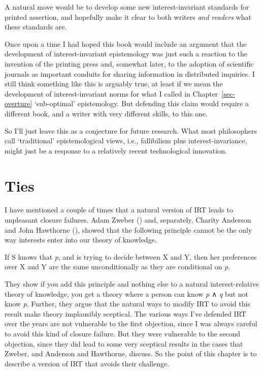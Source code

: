 \documentclass[
  10pt,
  letterpaper,
  twoside]{scrbook}
\providecommand{\tightlist}{%
  \setlength{\itemsep}{0pt}\setlength{\parskip}{0pt}}\usepackage{longtable,booktabs,array}
\begin{document}
A natural move would be to develop some new interest-invariant standards
for printed assertion, and hopefully make it clear to both writers
\emph{and readers} what these standards are.

Once upon a time I had hoped this book would include an argument that
the development of interest-invariant epistemology was just such a
reaction to the invention of the printing press and, somewhat later, to
the adoption of scientific journals as important conduits for sharing
information in distributed inquiries. I still think something like this
is arguably true, at least if we mean the development of
interest-invariant norms for what I called in Chapter~\ref{sec-overture}
`sub-optimal' epistemology. But defending this claim would require a
different book, and a writer with very different skills, to this one.

So I'll just leave this as a conjecture for future research. What most
philosophers call `traditional' epistemological views, i.e., fallibilism
plus interest-invariance, might just be a response to a relatively
recent technological innovation.


\chapter{Ties}\label{sec-ties}

I have mentioned a couple of times that a natural version of IRT leads
to unpleasant closure failures. Adam Zweber
() and, separately, Charity Anderson and
John Hawthorne (), showed
that the following principle cannot be the only way interests enter into
our theory of knowledge.

\begin{description}
\tightlist
\item[Conditional Preferences]
If S knows that \emph{p}, and is trying to decide between X and Y, then
her preferences over X and Y are the same unconditionally as they are
conditional on \emph{p}.
\end{description}

They show if you add this principle and nothing else to a natural
interest-relative theory of knowledge, you get a theory where a person
can know \emph{p} ∧ \emph{q} but not know \emph{p}. Further, they argue
that the natural ways to modify IRT to avoid this result make theory
implausibly sceptical. The various ways I've defended IRT over the years
are not vulnerable to the first objection, since I was always careful to
avoid this kind of closure failure. But they were vulnerable to the
second objection, since they did lead to some very sceptical results in
the cases that Zweber, and Anderson and Hawthorne, discuss. So the point
of this chapter is to describe a version of IRT that avoids their
challenge.
\end{document}
